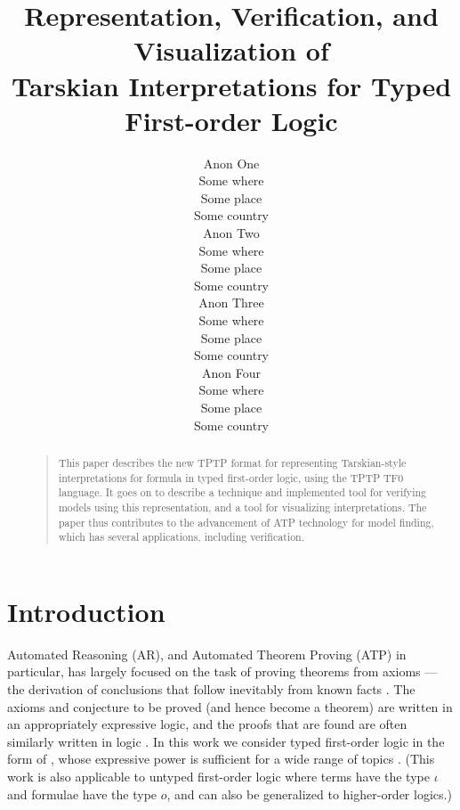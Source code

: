 \documentclass[letterpaper]{article}
\begin{document}

\title{Representation, Verification, and Visualization of\\
Tarskian Interpretations for Typed First-order Logic}
\author{Anon One\\
Some where\\
Some place\\
Some country\\
\And
Anon Two\\
Some where\\
Some place\\
Some country\\
\And
Anon Three\\
Some where\\
Some place\\
Some country\\
\And
Anon Four\\
Some where\\
Some place\\
Some country}

\maketitle
\begin{abstract}
\begin{quote}
This paper describes the new TPTP format for representing Tarskian-style interpretations for
formula in typed first-order logic, using the TPTP TF0 language.
It goes on to describe a technique and implemented tool for verifying models using this
representation, and a tool for visualizing interpretations.
The paper thus contributes to the advancement of ATP technology for model finding, which has
several applications, including verification.
\end{quote}
\end{abstract}
\section{Introduction}
\label{Introduction}

Automated Reasoning (AR), and Automated Theorem Proving (ATP) in particular, has largely focused
on the task of proving theorems from axioms --- the derivation of conclusions that follow inevitably 
from known facts \cite{RV01-HAR}.
The axioms and conjecture to be proved (and hence become a theorem) are written in an 
appropriately expressive logic, and the proofs that are found are often similarly written in
logic \cite{SS+06}.
In this work we consider typed first-order logic in the form of \cite{Wal83,Sch85,Coh87},
whose expressive power is sufficient for a wide range of topics \cite{Sut17}.
(This work is also applicable to untyped first-order logic where terms have the type $\iota$ 
and formulae have the type $o$, and can also be generalized to higher-order logics.)
\end{document}
